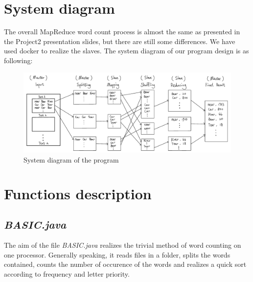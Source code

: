 \documentclass[a4paper,14pt,UTF8]{article}
\begin{document}
	
	\newpage
	\begin{center}
		\tableofcontents
	\end{center}
	\clearpage
	
	
	\section{System diagram}
	\quad The overall MapReduce word count process is almost the same as presented in the Project2 presentation slides, but there are still some differences. We have used docker to realize the slaves. The system diagram of our program design is as following:
	
	\begin{figure}[h]
		\setlength{\abovecaptionskip}{-0.cm}
		
	\begin{center}
		\includegraphics[width=17cm]{system_diagram}
	\end{center}
		\caption{System diagram of the program}
	\end{figure}
	

	\section{Functions description}
	
	\subsection{\textit{BASIC.java}}
	\quad The aim of the file \textit{BASIC.java} realizes the trivial method of word counting on one processor. Generally speaking, it reads files in a folder, splits the words contained, counts the number of occurence of the words and realizes a quick sort according to frequency and letter priority.\par 
\end{document}
